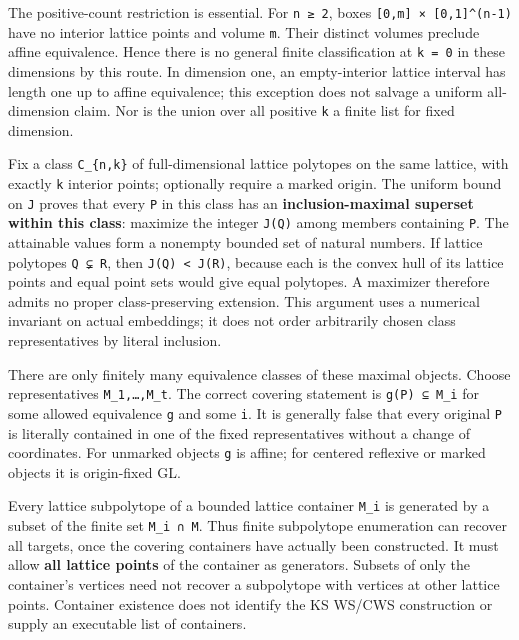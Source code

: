 \documentclass[11pt,a4paper,oneside]{report}
\begin{document}
The positive-count restriction is essential. For \texttt{n ≥ 2}, boxes
\texttt{[\allowbreak{}0,\allowbreak{}m]\allowbreak{} × [\allowbreak{}0,\allowbreak{}1]\allowbreak{}\textasciicircum{}(\allowbreak{}n-\allowbreak{}1)}
have no interior lattice points and volume \texttt{m}. Their distinct
volumes preclude affine equivalence. Hence there is no general finite
classification at \texttt{k =\allowbreak{} 0} in these dimensions by
this route. In dimension one, an empty-interior lattice interval has
length one up to affine equivalence; this exception does not salvage a
uniform all-dimension claim. Nor is the union over all positive
\texttt{k} a finite list for fixed dimension.

Fix a class \texttt{C\_\allowbreak{}\{n,\allowbreak{}k\}} of
full-dimensional lattice polytopes on the same lattice, with exactly
\texttt{k} interior points; optionally require a marked origin. The
uniform bound on \texttt{J} proves that every \texttt{P} in this class
has an \textbf{inclusion-maximal superset within this class}: maximize
the integer \texttt{J(\allowbreak{}Q)} among members containing
\texttt{P}. The attainable values form a nonempty bounded set of natural
numbers. If lattice polytopes \texttt{Q ⊊ R}, then
\texttt{J(\allowbreak{}Q)\allowbreak{} < J(\allowbreak{}R)}, because
each is the convex hull of its lattice points and equal point sets would
give equal polytopes. A maximizer therefore admits no proper
class-preserving extension. This argument uses a numerical invariant on
actual embeddings; it does not order arbitrarily chosen class
representatives by literal inclusion.

There are only finitely many equivalence classes of these maximal
objects. Choose representatives
\texttt{M\_\allowbreak{}1,\allowbreak{}…,\allowbreak{}M\_\allowbreak{}t}.
The correct covering statement is
\texttt{g(\allowbreak{}P)\allowbreak{} ⊆ M\_\allowbreak{}i} for some
allowed equivalence \texttt{g} and some \texttt{i}. It is generally
false that every original \texttt{P} is literally contained in one of
the fixed representatives without a change of coordinates. For unmarked
objects \texttt{g} is affine; for centered reflexive or marked objects
it is origin-fixed GL.

Every lattice subpolytope of a bounded lattice container
\texttt{M\_\allowbreak{}i} is generated by a subset of the finite set
\texttt{M\_\allowbreak{}i ∩ M}. Thus finite subpolytope enumeration can
recover all targets, once the covering containers have actually been
constructed. It must allow \textbf{all lattice points} of the container
as generators. Subsets of only the container's vertices need not recover
a subpolytope with vertices at other lattice points. Container existence
does not identify the KS WS/CWS construction or supply an executable
list of containers.
\end{document}
